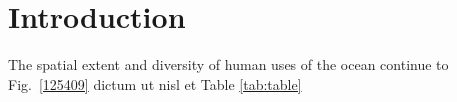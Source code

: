 \section{Introduction}
\label{introduction}

The spatial extent and diversity of human uses of the ocean continue to  Fig.~\ref{125409} dictum ut nisl et Table \ref{tab:table}
